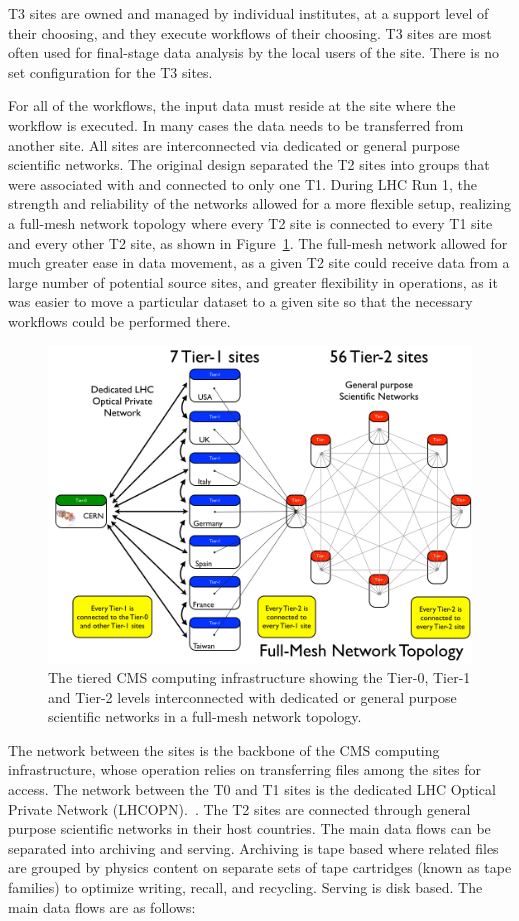 T3 sites are owned and managed by individual institutes, at a support level
of their choosing, and they execute workflows of their choosing.  T3 sites
are most often used for final-stage data analysis by the local users of the
site.  There is no set configuration for the T3 sites.

For all of the workflows, the input data must reside at the site where the
workflow is executed.  In many cases the data needs to be transferred from
another site.  All sites are interconnected via dedicated or general
purpose scientific networks. The original design separated the T2 sites
into groups that were associated with and connected to only one T1. During
LHC Run 1, the strength and reliability of the networks allowed for a more
flexible setup, realizing a full-mesh network topology where every T2 site
is connected to every T1 site and every other T2 site, as shown in
Figure~\ref{fig:distributed_topology}.  The full-mesh network allowed for
much greater ease in data movement, as a given T2 site could receive data
from a large number of potential source sites, and greater flexibility in
operations, as it was easier to move a particular dataset to a given site
so that the necessary workflows could be performed there.

\begin{figure}
\begin{center}
\includegraphics[width=.5\textwidth]{figs/distributed_topology}
\end{center}
\caption{The tiered CMS computing infrastructure showing the Tier-0, Tier-1 and Tier-2 levels interconnected with dedicated or general purpose scientific networks in a full-mesh network topology.
  \label{fig:distributed_topology}}
\end{figure}

The network between the sites is the backbone of the CMS computing
infrastructure, whose operation relies on transferring files among the
sites for access. The network between the T0 and T1 sites is the dedicated
LHC Optical Private Network (LHCOPN).~. The T2 sites are connected through general purpose
scientific networks in their host countries. The main data flows can be
separated into archiving and serving. Archiving is tape based where related
files are grouped by physics content on separate sets of tape cartridges
(known as tape families) to optimize writing, recall, and
recycling. Serving is disk based. The main data flows are as follows:


